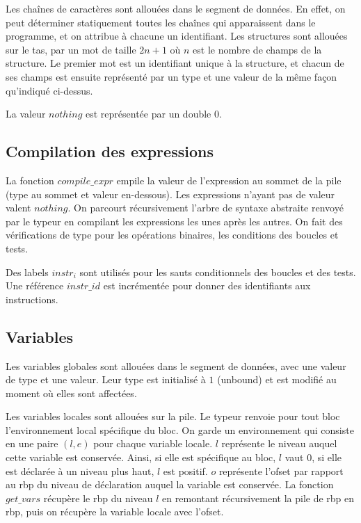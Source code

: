 \documentclass[10pt,a4paper]{article}
\begin{document}
Les chaînes de caractères sont allouées dans le segment de données. En effet, on peut déterminer statiquement toutes les chaînes qui apparaissent dans le programme, et on attribue à chacune un identifiant. Les structures sont allouées sur le tas, par un mot de taille $2n+1$ où $n$ est le nombre de champs de la structure. Le premier mot est un identifiant unique à la structure, et chacun de ses champs est ensuite représenté par un type et une valeur de la même façon qu'indiqué ci-dessus. 

La valeur $nothing$ est représentée par un double $0$. 

\subsection{Compilation des expressions}
La fonction $compile\_expr$ empile la valeur de l'expression au sommet de la pile (type au sommet et valeur en-dessous). Les expressions n'ayant pas de valeur valent $nothing$. On parcourt récursivement l'arbre de syntaxe abstraite renvoyé par le typeur en compilant les expressions les unes après les autres. On fait des vérifications de type pour les opérations binaires, les conditions des boucles et tests. 

Des labels $instr_i$ sont utilisés pour les sauts conditionnels des boucles et des tests. Une référence $instr\_id$ est incrémentée pour donner des identifiants aux instructions.

\subsection{Variables}
Les variables globales sont allouées dans le segment de données, avec une valeur de type et une valeur. Leur type est initialisé à $1$ (unbound) et est modifié au moment où elles sont affectées. 

Les variables locales sont allouées sur la pile. Le typeur renvoie pour tout bloc l'environnement local spécifique du bloc. On garde un environnement qui consiste en une paire $(l,e)$ pour chaque variable locale. $l$ représente le niveau auquel cette variable est conservée. Ainsi, si elle est spécifique au bloc, $l$ vaut $0$, si elle est déclarée à un niveau plus haut, $l$ est positif. $o$ représente l'ofset par rapport au rbp du niveau de déclaration auquel la variable est conservée. La fonction $get\_vars$ récupère le rbp du niveau $l$ en remontant récursivement la pile de rbp en rbp, puis on récupère la variable locale avec l'ofset.
\end{document}
